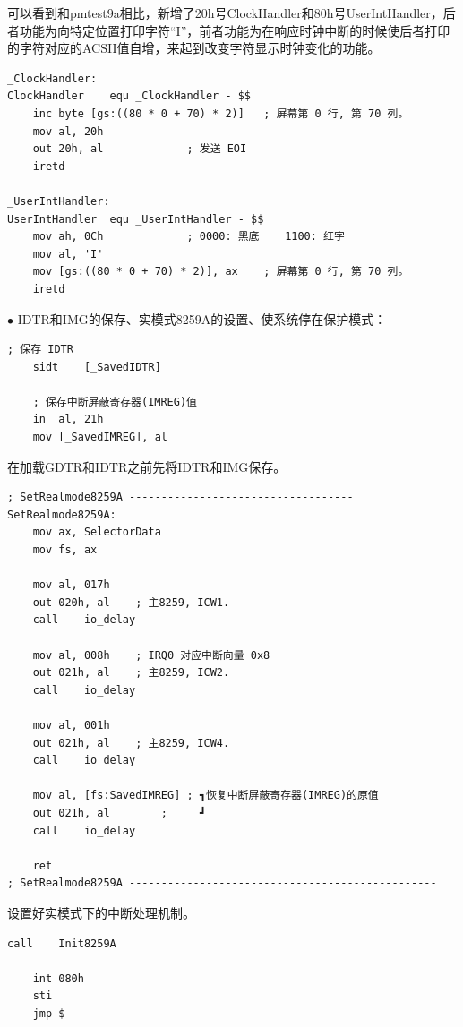 \documentclass[UTF8,12pt]{ctexart}
\begin{document}
    可以看到和pmtest9a相比，新增了20h号ClockHandler和80h号UserIntHandler，后者功能为向特定位置打印字符“I”，前者功能为在响应时钟中断的时候使后者打印的字符对应的ACSII值自增，来起到改变字符显示时钟变化的功能。
    
    \begin{lstlisting}[language={[x86masm]Assembler}]
_ClockHandler:
ClockHandler	equ	_ClockHandler - $$
	inc	byte [gs:((80 * 0 + 70) * 2)]	; 屏幕第 0 行, 第 70 列。
	mov	al, 20h
	out	20h, al				; 发送 EOI
	iretd

_UserIntHandler:
UserIntHandler	equ	_UserIntHandler - $$
	mov	ah, 0Ch				; 0000: 黑底    1100: 红字
	mov	al, 'I'
	mov	[gs:((80 * 0 + 70) * 2)], ax	; 屏幕第 0 行, 第 70 列。
	iretd
    \end{lstlisting}
    
    $\bullet$ IDTR和IMG的保存、实模式8259A的设置、使系统停在保护模式：
    
    \begin{lstlisting}[language={[x86masm]Assembler}]
    ; 保存 IDTR
	sidt	[_SavedIDTR]

	; 保存中断屏蔽寄存器(IMREG)值
	in	al, 21h
	mov	[_SavedIMREG], al
    \end{lstlisting}
    
    在加载GDTR和IDTR之前先将IDTR和IMG保存。
    
    \begin{lstlisting}[language={[x86masm]Assembler},caption={SetRealmode8259A}]
; SetRealmode8259A -----------------------------------
SetRealmode8259A:
	mov	ax, SelectorData
	mov	fs, ax

	mov	al, 017h
	out	020h, al	; 主8259, ICW1.
	call	io_delay

	mov	al, 008h	; IRQ0 对应中断向量 0x8
	out	021h, al	; 主8259, ICW2.
	call	io_delay

	mov	al, 001h
	out	021h, al	; 主8259, ICW4.
	call	io_delay

	mov	al, [fs:SavedIMREG]	; ┓恢复中断屏蔽寄存器(IMREG)的原值
	out	021h, al		;     ┛
	call	io_delay

	ret
; SetRealmode8259A ------------------------------------------------
    \end{lstlisting}
    
    设置好实模式下的中断处理机制。
    
    \begin{lstlisting}[language={[x86masm]Assembler}]
    call	Init8259A

	int	080h
	sti
	jmp	$
    \end{lstlisting}
    
\end{document}
